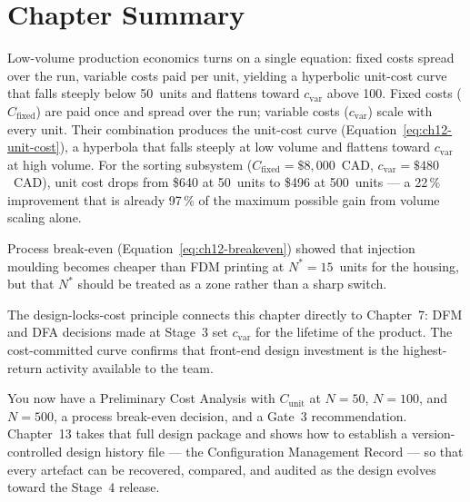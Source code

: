 \section*{Chapter Summary}
\label{sec:ch12-summary}

Low-volume production economics turns on a single equation: fixed costs spread over the run, variable costs paid per unit, yielding a hyperbolic unit-cost curve that falls steeply below 50~units and flattens toward $c_{\text{var}}$ above 100.
Fixed costs ($C_{\text{fixed}}$) are paid once and spread over the run;
variable costs ($c_{\text{var}}$) scale with every unit.
Their combination produces the unit-cost curve (Equation~\ref{eq:ch12-unit-cost}),
a hyperbola that falls steeply at low volume and flattens toward $c_{\text{var}}$
at high volume.
For the sorting subsystem ($C_{\text{fixed}} = \$8{,}000$~CAD,
$c_{\text{var}} = \$480$~CAD), unit cost drops from \$640 at 50~units to
\$496 at 500~units --- a 22\,\% improvement that is already 97\,\% of the
maximum possible gain from volume scaling alone.

Process break-even (Equation~\ref{eq:ch12-breakeven}) showed that injection
moulding becomes cheaper than FDM printing at $N^{*} = 15$~units for the
housing, but that $N^{*}$ should be treated as a zone rather than a sharp
switch.

The design-locks-cost principle connects this chapter directly to Chapter~7:
DFM and DFA decisions made at Stage~3 set $c_{\text{var}}$ for the lifetime of
the product.
The cost-committed curve confirms that front-end design investment is the
highest-return activity available to the team.

You now have a Preliminary Cost Analysis with $C_{\text{unit}}$ at $N = 50$,
$N = 100$, and $N = 500$, a process break-even decision, and a Gate~3
recommendation.
Chapter~13 takes that full design package and shows how to establish a version-controlled design history file --- the Configuration Management Record --- so that every artefact can be recovered, compared, and audited as the design evolves toward the Stage~4 release.
